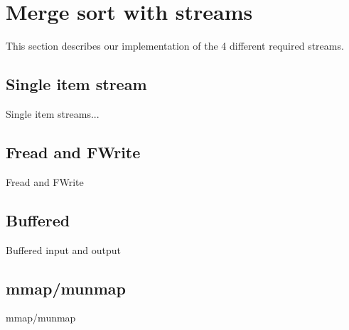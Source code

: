 \section{Merge sort with streams}
This section describes our implementation of the 4 different required streams. 

\subsection{Single item stream}
Single item streams...


\subsection{Fread and FWrite}
Fread and FWrite 


\subsection{Buffered}
Buffered input and output


\subsection{mmap/munmap}
mmap/munmap 
